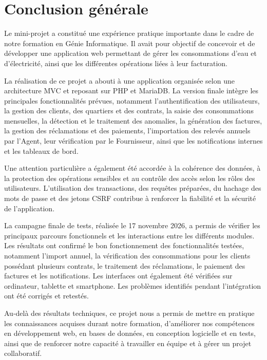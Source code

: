 
\chapter*{Conclusion générale}

Le mini-projet \projectname{} a constitué une expérience pratique importante dans le cadre de notre formation en Génie Informatique. Il avait pour objectif de concevoir et de développer une application web permettant de gérer les consommations d'eau et d'électricité, ainsi que les différentes opérations liées à leur facturation.

La réalisation de ce projet a abouti à une application organisée selon une architecture MVC et reposant sur PHP et MariaDB. La version finale intègre les principales fonctionnalités prévues, notamment l'authentification des utilisateurs, la gestion des clients, des quartiers et des contrats, la saisie des consommations mensuelles, la détection et le traitement des anomalies, la génération des factures, la gestion des réclamations et des paiements, l'importation des relevés annuels par l'Agent, leur vérification par le Fournisseur, ainsi que les notifications internes et les tableaux de bord.

Une attention particulière a également été accordée à la cohérence des données, à la protection des opérations sensibles et au contrôle des accès selon les rôles des utilisateurs. L'utilisation des transactions, des requêtes préparées, du hachage des mots de passe et des jetons CSRF contribue à renforcer la fiabilité et la sécurité de l'application.

La campagne finale de tests, réalisée le 17 novembre 2026, a permis de vérifier les principaux parcours fonctionnels et les interactions entre les différents modules. Les résultats ont confirmé le bon fonctionnement des fonctionnalités testées, notamment l'import annuel, la vérification des consommations pour les clients possédant plusieurs contrats, le traitement des réclamations, le paiement des factures et les notifications. Les interfaces ont également été vérifiées sur ordinateur, tablette et smartphone. Les problèmes identifiés pendant l'intégration ont été corrigés et retestés.

Au-delà des résultats techniques, ce projet nous a permis de mettre en pratique les connaissances acquises durant notre formation, d'améliorer nos compétences en développement web, en bases de données, en conception logicielle et en tests, ainsi que de renforcer notre capacité à travailler en équipe et à gérer un projet collaboratif.

